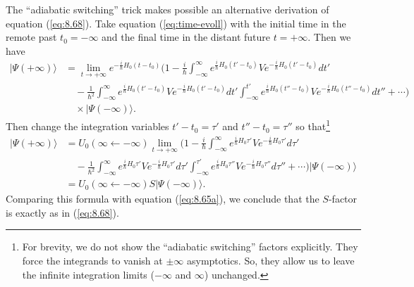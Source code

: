 \documentclass[]{stefan1}
\begin{document}
The ``adiabatic switching'' trick makes possible an alternative
derivation of equation (\ref{eq:8.68}). Take equation
(\ref{eq:time-evoll}) with the initial time in the remote past
$ t_{0} = - \infty $ and the final time in the distant future
$ t = + \infty $. Then we have
%
\begin{align*}
|\Psi (+\infty ) \rangle
&=\lim_{t \to +\infty }e^{-\frac{i}{\hbar }H_{0}
(t-t_{0})} \Biggl(1-\frac{i}{
\hbar } \int
_{-\infty }^{\infty } e^{\frac{i}{\hbar }H_{0}  ( t'-t
_{0} ) } V e^{-\frac{i}{\hbar }H_{0}  ( t'-t_{0} ) }dt'
\\
&\quad  -\frac{1}{\hbar^{2}} \int_{-\infty }^{\infty }
e^{\frac{i}{\hbar
}H_{0}
 ( t'-t_{0} ) } V e^{-\frac{i}{\hbar }H_{0}  ( t'-t
_{0} ) }dt' \int_{-\infty }^{t'}
e^{\frac{i}{\hbar }H_{0}  ( t''-t
_{0} ) } V e^{-\frac{i}{\hbar }H_{0}  ( t''-t_{0} ) }dt'' + \cdots
\Biggr)
\\
&\quad  \times|\Psi (-\infty ) \rangle .
\end{align*}
Then change the integration variables $ t'-t_{0} = \tau '$ and
$ t''- t_{0} = \tau ''$ so that\footnote{For brevity, we do not show
the ``adiabatic switching'' factors explicitly. They force the
integrands to vanish at $\pm \infty $ asymptotics. So, they allow us to
leave the infinite integration limits ($ - \infty $ and $ \infty $)
unchanged.}
%
\begin{align*}
|\Psi (+\infty ) \rangle
&=U_{0}(\infty \gets -\infty )\lim_{t \to +\infty } \Biggl(1-
\frac{i}{
\hbar } \int_{-\infty }^{\infty } e^{\frac{i}{\hbar }H_{0} \tau '} V e
^{-\frac{i}{\hbar }H_{0} \tau '}d \tau '
\\
&\quad  -\frac{1}{\hbar^{2}} \int_{-\infty }^{\infty }
e^{\frac{i}{\hbar
}H_{0}
\tau '} V e^{-\frac{i}{\hbar }H_{0} \tau '}d\tau ' \int_{-
\infty }^{\tau '}
e^{\frac{i}{\hbar }H_{0} \tau ''} V e^{-\frac{i}{
\hbar }H_{0} \tau ''}d \tau '' + \cdots
\Biggr) |\Psi (-\infty ) \rangle
\\
&= U_{0}(\infty \gets -\infty ) S |\Psi (-\infty ) \rangle .
\end{align*}
Comparing this formula with equation (\ref{eq:8.65a}), we conclude that
the $ S $-factor is exactly as in (\ref{eq:8.68}).

\end{document}
